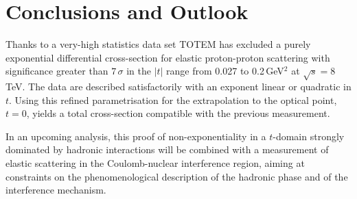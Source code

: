 
\section{Conclusions and Outlook}
%
Thanks to a very-high statistics data set TOTEM has excluded a purely exponential differential 
cross-section for elastic proton-proton scattering with significance greater than $7\,\sigma$
in the $|t|$ range from 0.027 to 0.2\,GeV$^{2}$ at $\sqrt{s}=8\,$TeV. The data
are described satisfactorily with an exponent linear or quadratic in $t$.
Using this refined parametrisation for the extrapolation to the optical point,
$t = 0$, yields a total cross-section compatible with the previous measurement.

In an upcoming analysis, this proof of non-exponentiality in a 
$t$-domain strongly
dominated by hadronic interactions will be combined with a measurement of 
elastic scattering in the Coulomb-nuclear interference region, aiming at 
constraints on the phenomenological description of the hadronic phase and of 
the interference mechanism.


